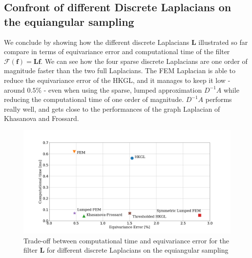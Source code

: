 \subsection{Confront of different Discrete Laplacians on the equiangular sampling}
We conclude by showing how the different discrete Laplacians $\mathbf L$ illustrated so far compare in terms of equivariance error and computational time of the filter $\mathcal F(\mathbf f) = \mathbf L\mathbf f$. We can see how the four sparse discrete Laplacians are one order of magnitude faster than the two full Laplacians. The FEM Laplacian is able to reduce the equivariance error of the HKGL, and it manages to keep it low - around $0.5\%$ - even when using the sparse, lumped approximation $D^{-1}A$ while reducing the computational time of one order of magnitude. $D^{-1}A$ performs really well, and gets close to the performances of the graph Laplacian of Khasanova and Frossard. 
\begin{figure}[h!]
	\centering
	\includegraphics[width=\textwidth]{../codes/06.Equivariance_error/tradeoff.png}
	\caption{\label{fig:tradeoff}Trade-off between computational time and equivariance error for the filter $\mathbf L$ for different discrete Laplacians on the equiangular sampling}
\end{figure}

